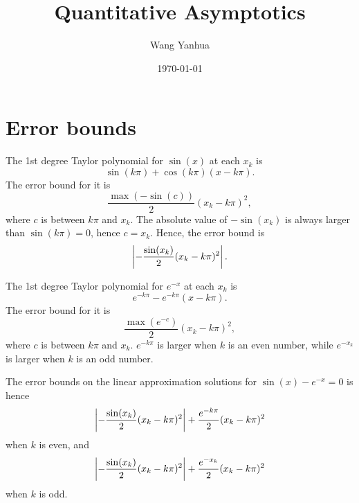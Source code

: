 \documentclass[11pt,reqno,oneside,a4paper]{article}
\author{Wang Yanhua}
\title{Quantitative Asymptotics}
\date{\today}
\begin{document}
\maketitle
\thispagestyle{fancy}

\section*{Error bounds}

The 1st degree Taylor polynomial for $\sin (x)$ at each $x_k$ is 
$$\sin(k\pi) + \cos(k\pi) (x-k\pi).$$
The error bound for it is 
$$ \frac{\max(-\sin(c))}{2}(x_k - k\pi)^2,$$ 
where $c$ is between $k\pi$ and $x_k$. The absolute value of $-\sin(x_k)$ is always larger than $\sin(k\pi) =0$, hence $c = x_k$. Hence, the error bound is 
$$\left\lvert-\frac{\sin(x_k)}{2}(x_k - k\pi)^2\right\rvert.$$

The 1st degree Taylor polynomial for  $e^{-x}$ at each $x_k$ is
$$e^{-k\pi} - e^{-k\pi}(x-k\pi). $$
The error bound for it is $$ \frac{\max(e^{-c})}{2}(x_k - k\pi)^2,$$ where $c$ is between $k\pi$ and $x_k$. $e^{-k\pi}$ is larger when $k$ is an even number, while $e^{-x_k}$ is larger when $k$ is an odd number.

The error bounds on the linear approximation solutions for $\sin (x) - e^{-x} = 0$ is hence $$\left\lvert-\frac{\sin(x_k)}{2}(x_k - k\pi)^2\right\rvert+ \frac{e^{-k\pi}}{2}(x_k - k\pi)^2 $$ when $k$ is even, and  $$\left\lvert-\frac{\sin(x_k)}{2}(x_k - k\pi)^2\right\rvert +  \frac{e^{-x_k}}{2}(x_k - k\pi)^2$$ when $k$ is odd.
\end{document}
